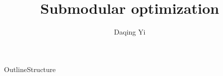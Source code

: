 \documentclass{beamer}
\title{Submodular optimization}
\author{ Daqing Yi }
\institute
{
  HCMI lab\\
  Brigham Young University
}
\date[]{}
\begin{document}
\begin{frame}
  \titlepage
\end{frame}

\begin{frame}{Outline}{Structure}
  \tableofcontents
\end{frame}







\end{document}
